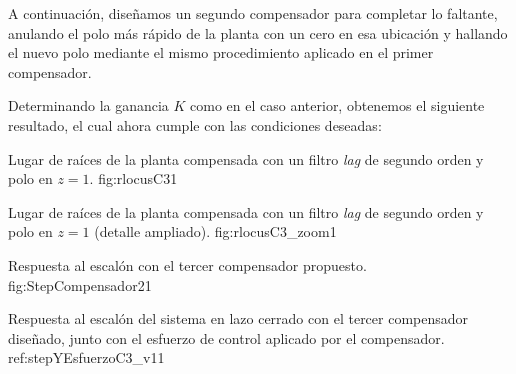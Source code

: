 A continuación, diseñamos un segundo compensador para completar lo faltante, anulando el polo más rápido de la planta con un cero en esa ubicación y hallando el nuevo polo mediante el mismo procedimiento aplicado en el primer compensador.

Determinando la ganancia $K$ como en el caso anterior, obtenemos el siguiente resultado, el cual ahora cumple con las condiciones deseadas:

{Lugar de raíces de la planta compensada con un filtro \emph{lag} de segundo orden y polo en $z=1$.}
{fig:rlocusC3}{1}

{Lugar de raíces de la planta compensada con un filtro \emph{lag} de segundo orden y polo en $z=1$ (detalle ampliado).}
{fig:rlocusC3_zoom}{1}

{Respuesta al escalón con el tercer compensador propuesto.}
{fig:StepCompensador2}{1}

{Respuesta al escal\'on del sistema en lazo cerrado con el tercer compensador dise\~nado, junto con el esfuerzo de control aplicado por el compensador.}
{ref:stepYEsfuerzoC3_v1}{1}

